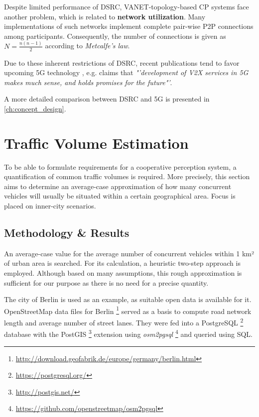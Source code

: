 Despite limited performance of DSRC, VANET-topology-based CP systems face another problem, which is related to \textbf{network utilization}. Many implementations of such networks implement complete pair-wise P2P connections among participants. Consequently, the number of connections is given as $N = \frac{n(n-1)}{2 }$ according to \textit{Metcalfe's law}. 

Due to these inherent restrictions of DSRC, recent publications tend to favor upcoming 5G technology \cite{Briegleb2019, 5GAutomotiveAssociation2016}, e.g. \cite{Wevers2017} claims that \textit{"'development of V2X services in 5G makes much sense, and holds promises for the future"'}.

A more detailed comparison between DSRC and 5G is presented in \autoref{ch:concept_design}.

\section{Traffic Volume Estimation}
\label{sec:problem_analysis:traffic_volume_estimation}

To be able to formulate requirements for a cooperative perception system, a quantification of common traffic volumes is required. More precisely, this section aims to determine an average-case approximation of how many concurrent vehicles will usually be situated within a certain geographical area. Focus is placed on inner-city scenarios. 

\subsection{Methodology \& Results}
\label{subsec:problem_analysis:methodology_results}
An average-case value for the average number of concurrent vehicles within 1 km² of urban area is searched. For its calculation, a heuristic two-step approach is employed. Although based on many assumptions, this rough approximation is sufficient for our purpose as there is no need for a precise quantity. 

The city of Berlin is used as an example, as suitable open data is available for it. OpenStreetMap data files for Berlin \footnote{\url{http://download.geofabrik.de/europe/germany/berlin.html}} served as a basis to compute road network length and average number of street lanes. They were fed into a PostgreSQL \footnote{\url{https://postgresql.org/}} database with the PostGIS \footnote{\url{http://postgis.net/}} extension using \textit{osm2pgsql} \footnote{\url{https://github.com/openstreetmap/osm2pgsql}} and queried using SQL.

